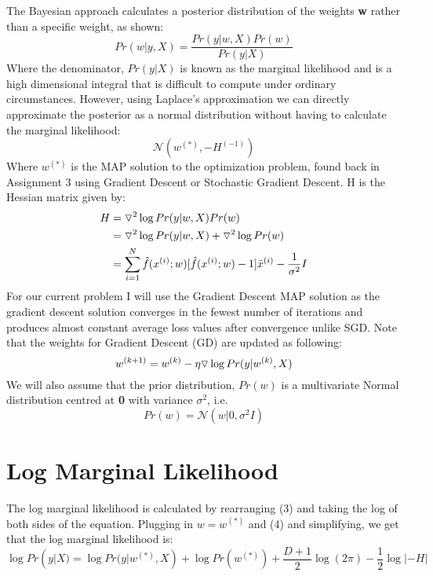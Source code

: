 \documentclass[11pt,letterpaper,titlepage]{article}
\begin{document}
	The Bayesian approach calculates a posterior distribution of the weights \textbf{w} rather than a specific weight, as shown:
	\begin{equation}
		Pr(w | y, X) = \frac{Pr(y|w, X) Pr(w)}{Pr(y|X)}
	\end{equation}
	Where the denominator, $Pr(y|X)$ is known as the marginal likelihood and is a high dimensional integral that is difficult to compute under ordinary circumstances. However, using Laplace's approximation we can directly approximate the posterior as a normal distribution without having to calculate the marginal likelihood: 
	\begin{equation}
		\mathcal{N}(w^{(*)},-H^{(-1)})
	\end{equation}
	Where $w^{(*)}$ is the MAP solution to the optimization problem, found back in Assignment 3 using Gradient Descent or Stochastic Gradient Descent. H is the Hessian matrix given by:
	\begin{equation}
	\begin{split}
	H &= \triangledown^{2} \log Pr(y|w, X) Pr(w) \\ 
	&= \triangledown^{2} \log Pr(y|w, X) + \triangledown^{2} \log Pr (w)\\
	&= \sum_{i=1}^{N} \hat{f}( x^{(i)};  w ) [\hat{f}( x^{(i)};  w ) - 1] \bar{x}^{(i)} - \frac{1}{\sigma^{2}}\boldmath I
	\end{split}		
	\end{equation}
	 For our current problem I will use the Gradient Descent MAP solution as the gradient descent solution converges in the fewest number of iterations and produces almost constant average loss values after convergence unlike SGD. Note that the weights for Gradient Descent (GD) are updated as following:
	\begin{equation}
	\boldmath w^{(k+1)} \unboldmath = \boldmath w^{(k)} \unboldmath - \eta \triangledown \log Pr(\boldmath y \unboldmath | \boldmath w^{(k)} \unboldmath, \boldmath X \unboldmath)
	\end{equation}
	We will also assume that the prior distribution, $Pr(w)$ is a multivariate Normal distribution centred at \textbf{0} with variance $\sigma ^{2}$, i.e.
	\begin{equation}
		Pr(w)=\mathcal{N}(w|0,\sigma^{2}I)
	\end{equation}
	
	\section{Log Marginal Likelihood}
	The log marginal likelihood is calculated by rearranging (3) and taking the log of both sides of the equation. Plugging in $w=w^{(*)}$ and (4) and simplifying, we get that the log marginal likelihood is:
	\begin{equation}
		\log Pr(y|X) = \log Pr(y|w^{(*)}, X) + \log Pr(w^{(*)}) + \frac{D+1}{2}\log(2\pi) - \frac{1}{2}\log|-H|
	\end{equation}
 
\end{document}
